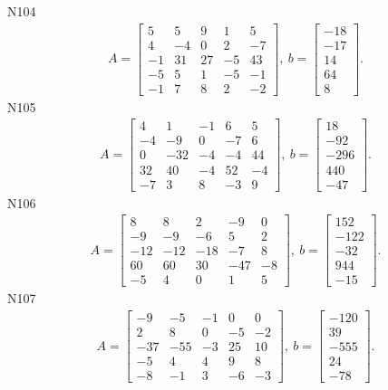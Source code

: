 \documentclass[11pt]{report}
\begin{document}
N104
\begin{align*}
 A = \left[\begin{matrix}5 & 5 & 9 & 1 & 5\\4 & -4 & 0 & 2 & -7\\-1 & 31 & 27 & -5 & 43\\-5 & 5 & 1 & -5 & -1\\-1 & 7 & 8 & 2 & -2\end{matrix}\right],
\ b = \left[\begin{matrix}-18\\-17\\14\\64\\8\end{matrix}\right]. 
 \end{align*}
N105
\begin{align*}
 A = \left[\begin{matrix}4 & 1 & -1 & 6 & 5\\-4 & -9 & 0 & -7 & 6\\0 & -32 & -4 & -4 & 44\\32 & 40 & -4 & 52 & -4\\-7 & 3 & 8 & -3 & 9\end{matrix}\right],
\ b = \left[\begin{matrix}18\\-92\\-296\\440\\-47\end{matrix}\right]. 
 \end{align*}
N106
\begin{align*}
 A = \left[\begin{matrix}8 & 8 & 2 & -9 & 0\\-9 & -9 & -6 & 5 & 2\\-12 & -12 & -18 & -7 & 8\\60 & 60 & 30 & -47 & -8\\-5 & 4 & 0 & 1 & 5\end{matrix}\right],
\ b = \left[\begin{matrix}152\\-122\\-32\\944\\-15\end{matrix}\right]. 
 \end{align*}
N107
\begin{align*}
 A = \left[\begin{matrix}-9 & -5 & -1 & 0 & 0\\2 & 8 & 0 & -5 & -2\\-37 & -55 & -3 & 25 & 10\\-5 & 4 & 4 & 9 & 8\\-8 & -1 & 3 & -6 & -3\end{matrix}\right],
\ b = \left[\begin{matrix}-120\\39\\-555\\24\\-78\end{matrix}\right]. 
 \end{align*}
\end{document}

